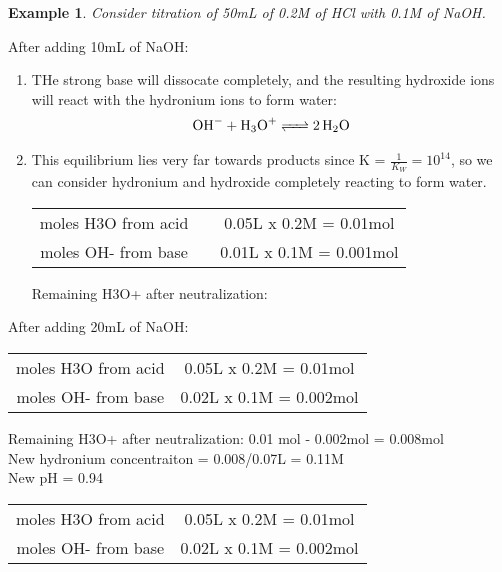 \documentclass{article}  %
\newtheorem{exmp}{Example}
\begin{document}
\begin{exmp}
    Consider titration of 50mL of 0.2M of HCl with 0.1M of NaOH.
\end{exmp}
After adding 10mL of NaOH:
\begin{enumerate}
    \item THe strong base will dissocate completely, and the resulting hydroxide ions will react with the hydronium ions to form water:
    \begin{equation*}
        \begin{aligned}
            \ce{OH- + H3O+ <=> 2H2O}
        \end{aligned}
    \end{equation*}
    \item This equilibrium lies very far towards products since K = $\frac{1}{K_W} = 10^{14}$, so we can consider hydronium and hydroxide completely reacting to form water.
    \newline
    \begin{tabular}{c@{}c@{}c@{}}
        moles H3O from acid && 0.05L x 0.2M = 0.01mol \\
        moles OH- from base && 0.01L x 0.1M = 0.001mol \\
    \end{tabular}
    \newline
    Remaining H3O+ after neutralization:
\end{enumerate}
After adding 20mL of NaOH:
\begin{tabular}{c c}
    moles H3O from acid & 0.05L x 0.2M = 0.01mol \\
    moles OH- from base & 0.02L x 0.1M = 0.002mol \\
\end{tabular}
Remaining H3O+ after neutralization: 0.01 mol - 0.002mol = 0.008mol \\
New hydronium concentraiton =  0.008/0.07L = 0.11M \\
New pH = 0.94 \\
\newline
\begin{tabular}{ c c }
    moles H3O from acid & 0.05L x 0.2M = 0.01mol \\
    moles OH- from base & 0.02L x 0.1M = 0.002mol \\
\end{tabular}
\newline
\end{document}
